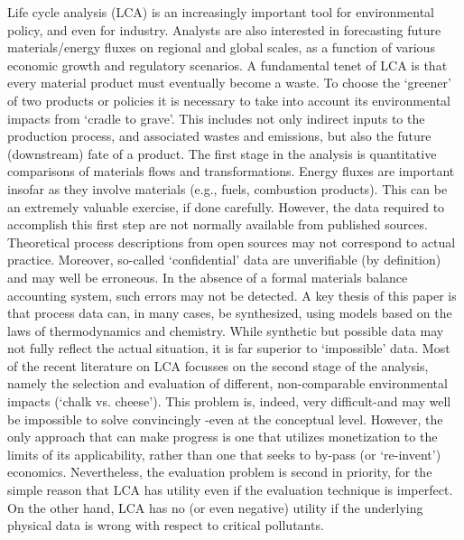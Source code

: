 \cite{ayres1995lcacritique}
Life cycle analysis (LCA) is an increasingly important tool for environmental policy, and even for industry. Analysts are also interested in forecasting future materials/energy fluxes on regional and global scales, as a function of various economic growth and regulatory scenarios. A fundamental tenet of LCA is that every material product must eventually become a waste. To choose the ‘greener’ of two products or policies it is necessary to take into account its environmental impacts from ‘cradle to grave’. This includes not only indirect inputs to the production process, and associated wastes and emissions, but also the future (downstream) fate of a product. The first stage in the analysis is quantitative comparisons of materials flows and transformations. Energy fluxes are important insofar as they involve materials (e.g., fuels, combustion products). This can be an extremely valuable exercise, if done carefully. However, the data required to accomplish this first step are not normally available from published sources. Theoretical process descriptions from open sources may not correspond to actual practice. Moreover, so-called ‘confidential’ data are unverifiable (by definition) and may well be erroneous. In the absence of a formal materials balance accounting system, such errors may not be detected. A key thesis of this paper is that process data can, in many cases, be synthesized, using models based on the laws of thermodynamics and chemistry. While synthetic but possible data may not fully reflect the actual situation, it is far superior to ‘impossible’ data. Most of the recent literature on LCA focusses on the second stage of the analysis, namely the selection and evaluation of different, non-comparable environmental impacts (‘chalk vs. cheese’). This problem is, indeed, very difficult-and may well be impossible to solve convincingly -even at the conceptual level. However, the only approach that can make progress is one that utilizes monetization to the limits of its applicability, rather than one that seeks to by-pass (or ‘re-invent’) economics. Nevertheless, the evaluation problem is second in priority, for the simple reason that LCA has utility even if the evaluation technique is imperfect. On the other hand, LCA has no (or even negative) utility if the underlying physical data is wrong with respect to critical pollutants.





